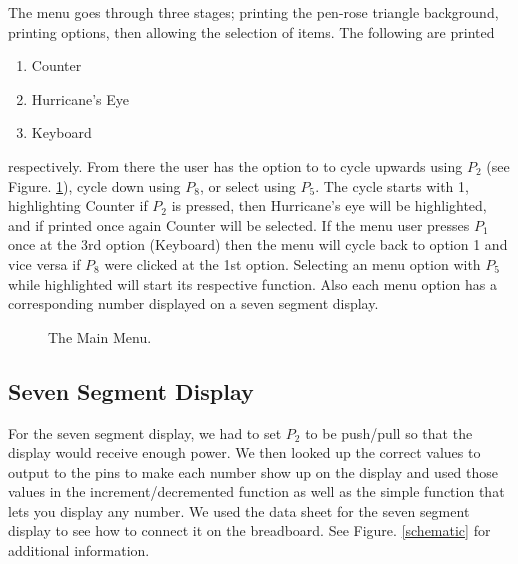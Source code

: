 \documentclass[12pt]{article}
\begin{document}
The menu goes through three stages; printing the pen-rose triangle background, printing options, then allowing the selection of items. The following are printed

\begin{enumerate}
    \item Counter
    \item Hurricane's Eye
    \item Keyboard
\end{enumerate}

\noindent respectively. From there the user has the option to to cycle upwards using $P_2$ (see Figure. \ref{menu}), cycle down using $P_8$, or select using $P_5$. The cycle starts with \num{1}, highlighting Counter if $P_2$ is pressed, then Hurricane's eye will be highlighted, and if printed once again Counter will be selected. If the menu user presses $P_1$ once at the 3rd option (Keyboard) then the menu will cycle back to option \num{1} and vice versa if $P_8$ were clicked at the 1st option. Selecting an menu option with $P_5$ while highlighted will start its respective function. Also each menu option has a corresponding number displayed on a seven segment display.

\begin{figure}[!ht]
    \centering
    \caption{The Main Menu.}
    \label{menu}
\end{figure}

\subsection{Seven Segment Display}
For the seven segment display, we had to set $P_2$ to be push/pull so that the display would receive enough power. We then looked up the correct values to output to the pins to make each number show up on the display and used those values in the increment/decremented function as well as the simple function that lets you display any number. We used the data sheet for the seven segment display to see how to connect it on the breadboard. See Figure. \ref{schematic} for additional information.
\end{document}
